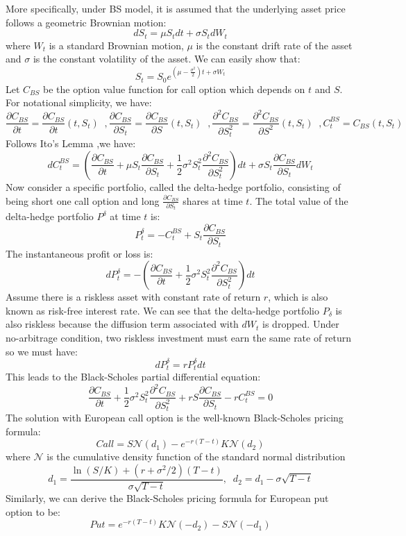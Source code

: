 \documentclass[letterpaper,12pt,titlepage,oneside,final]{book}
\numberwithin{equation}{section}
\theoremstyle{definition}
\begin{document}
More specifically, under BS model, it is assumed that the underlying asset price follows a geometric Brownian motion:
\[
dS_t=\mu S_t dt+\sigma S_t dW_t
\]
where $W_t$ is a standard Brownian motion, $\mu$ is the constant drift rate of  the asset and $\sigma$ is the constant volatility of the asset. We can easily show that:
\[
S_t=S_0 e^{(\mu-\frac{\sigma^2}{2})t+\sigma W_t}
\]
Let $C_{BS}$ be the option value function for call option which depends on $t$ and $S$. For notational simplicity, we have:
\[
   \frac{\partial C_{BS}}{\partial t}=\frac{\partial C_{BS}}{\partial t}(t,S_t) \;\;,
   \frac{\partial C_{BS}}{\partial S_t}=\frac{\partial C_{BS}}{\partial S}(t,S_t) \;\;,
   \frac{\partial^2 C_{BS}}{\partial S_t^2}=\frac{\partial^2 C_{BS}}{\partial S^2}(t,S_t) \;\;,
   C^{BS}_t=C_{BS}(t,S_t)
\]
Follows Ito's Lemma \cite{shreve2004stochastic},we have:
\[
dC^{BS}_t=\left(\frac{\partial C_{BS}}{\partial t}+\mu S_t \frac{\partial C_{BS}}{\partial S_t}+\frac{1}{2} \sigma^2 S_t^2 \frac{\partial ^2 C_{BS}}{ \partial S_t^2}\right) dt+\sigma S_t \frac{\partial C_{BS}}{\partial S_t}dW_t
\]
 Now consider a specific portfolio, called the delta-hedge portfolio, consisting of being short one call option and long $\frac{\partial C_{BS}}{\partial S_t}$ shares at time $t$.
The total value of the delta-hedge portfolio $P^{\delta}$ at time $t$ is:
\[
P^{\delta}_t=-C^{BS}_t+S_t \frac{\partial C_{BS}}{\partial S_t}
\]
The instantaneous profit or loss is:
\[
dP^{\delta}_t=-\left(\frac{\partial C_{BS}}{ \partial t} +\frac{1}{2} \sigma^2 S_t^2 \frac{\partial^2 C_{BS}}{ \partial S_t^2 } \right) dt
\]
Assume there is a riskless asset with constant rate of return $r$, which is also known as risk-free interest rate. We can see that the delta-hedge portfolio $P_{\delta}$ is also riskless because the diffusion term associated with $dW_t$ is dropped. Under no-arbitrage condition, two riskless investment must earn the same rate of return so we must have:
\[
dP^{\delta}_{t}=rP^{\delta}_tdt
\]
This leads to the Black-Scholes partial differential equation:
\begin{equation}
\frac{\partial C_{BS}}{\partial t}+\frac{1}{2}\sigma^2 S_t^2 \frac{\partial^2 C_{BS}}{\partial S_t^2}+rS \frac{\partial C_{BS}}{\partial S_t}-rC^{BS}_t=0
\label{eq:bspde}
\end{equation}
The solution with European call option  is the well-known Black-Scholes pricing formula:
\begin{equation}
Call=S  \mathcal{N}(d_1)-e^{-r(T-t)}  K  \mathcal{N}(d_2)
\label{eq:bs}
\end{equation}
where $\mathcal{N}$ is the cumulative density function of the standard normal distribution
\[
d_1=\frac{\ln(S/K)+(r+\sigma^2/2)(T-t)}{\sigma \sqrt{T-t}}, \;\; d_2=d_1-\sigma  \sqrt{T-t}
\]
Similarly, we can derive the Black-Scholes pricing formula for  European put option to be:
\begin{equation}
Put=e^{-r(T-t)}  K   \mathcal{N}(-d_2)-S  \mathcal{N}(-d_1)
\label{eq:bsP}
\end{equation}
\end{document}
